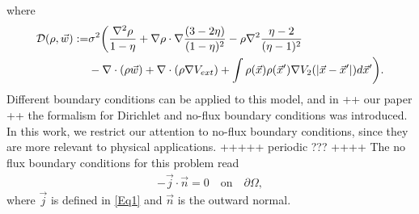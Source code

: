 \documentclass[final]{siamltex}
\newcommand{\w}{\vec{w}}
\newcommand{\n}{\vec{n}}
\newcommand{\x}{\vec{x}}
\begin{document}
where
\begin{align*} 
	\mathcal{D}(\rho,\w):=&\sigma^2  \bigg( \frac{\nabla^2 \rho}{1 - \eta} +  \nabla \rho \cdot \nabla \frac{(3- 2 \eta)}{(1 - \eta)^2}  - \rho \nabla^2\frac{\eta - 2}{(\eta - 1)^2}  \\
	&-  \nabla \cdot \left( \rho \w  \right) +  \nabla \cdot \left( \rho \nabla V_{ext}\right) + \int \rho(\x) \rho(\x') \nabla V_2(|\x - \x'|)d\x'\bigg). \notag
\end{align*}
Different boundary conditions can be applied to this model, and in ++ our paper ++ the formalism for Dirichlet and no-flux boundary conditions was introduced. In this work, we restrict our attention to no-flux boundary conditions, since they are more relevant to physical applications. +++++ periodic ??? ++++
The no flux boundary conditions for this problem read
\begin{align}\label{eq:noFluxBCs}
	- \vec j \cdot \n = 0 \quad \text{on} \quad \partial \Omega,
\end{align}
where $\vec j$ is defined in \eqref{Eq1} and $\n$ is the outward normal.
\end{document}
